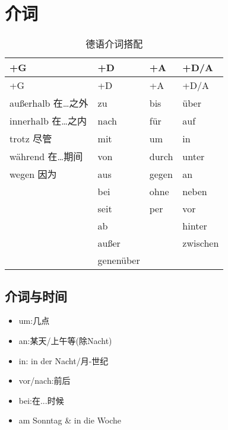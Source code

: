 \documentclass[12pt,A4paper,oneside,reqno]{amsart}
\numberwithin{equation}{section}
\theoremstyle{plain}
\theoremstyle{plain}
\theoremstyle{plain}
\numberwithin{equation}{section}
\theoremstyle{remark}
\begin{document}
\section{介词}
\begin{longtable}{l|l|l|l}
	\hline
+G		&	+D	&	+A	&	+D/A	\\
	\hline
	\endhead
	\hline
+G		&	+D	&	+A	&	+D/A	\\
	\hline
	\endfirsthead	
	\hline
	\endfoot
	\hline	
	\caption{德语介词搭配}
	\endlastfoot				
						
au\ss erhalb	在…之外	&	zu	&	bis	&	\"{u}ber	\\
innerhalb	在…之内	&	nach	&	f\"{u}r	&	auf	\\
trotz	尽管	&	mit	&	um	&	in	\\
w\"{a}hrend	在…期间	&	von	&	durch	&	unter	\\
wegen	因为	&	aus	&	gegen	&	an	\\
&	bei	&	ohne	&	neben	\\
&	seit	&	per	&	vor	\\
&	ab	&		&	hinter	\\
&	au\ss er	&		&	zwischen	\\
&	genen\"{u}ber	&		&		\\

	
\end{longtable}
\subsection{介词与时间}
\renewcommand\labelitemi{\normalfont\bfseries \textendash}
\begin{itemize}
	\item um:几点
	\item an:某天/上午等(除Nacht)
	\item in: in der Nacht/月-世纪
	\item vor/nach:前后
	\item bei:在...时候
	\item am Sonntag \& in die Woche
\end{itemize}
\renewcommand\labelitemi{\textbullet}
\end{document}
